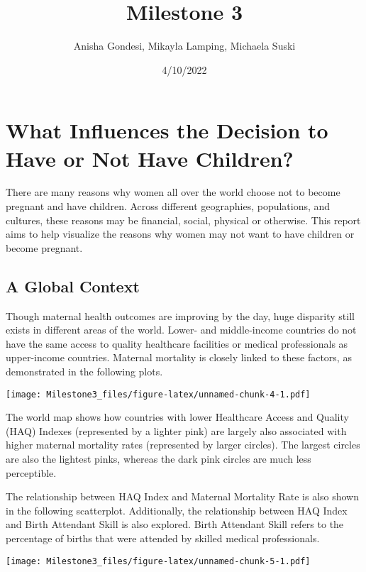 \documentclass[
]{article}
\title{Milestone 3}
\author{Anisha Gondesi, Mikayla Lamping, Michaela Suski}
\date{4/10/2022}
\begin{document}
\maketitle

\hypertarget{what-influences-the-decision-to-have-or-not-have-children}{%
\section{What Influences the Decision to Have or Not Have
Children?}\label{what-influences-the-decision-to-have-or-not-have-children}}

There are many reasons why women all over the world choose not to become
pregnant and have children. Across different geographies, populations,
and cultures, these reasons may be financial, social, physical or
otherwise. This report aims to help visualize the reasons why women may
not want to have children or become pregnant.

\hypertarget{a-global-context}{%
\subsection{A Global Context}\label{a-global-context}}

Though maternal health outcomes are improving by the day, huge disparity
still exists in different areas of the world. Lower- and middle-income
countries do not have the same access to quality healthcare facilities
or medical professionals as upper-income countries. Maternal mortality
is closely linked to these factors, as demonstrated in the following
plots.

\bigskip
\bigskip

\texttt{[image: Milestone3\_files/figure-latex/unnamed-chunk-4-1.pdf]}
\bigskip

The world map shows how countries with lower Healthcare Access and
Quality (HAQ) Indexes (represented by a lighter pink) are largely also
associated with higher maternal mortality rates (represented by larger
circles). The largest circles are also the lightest pinks, whereas the
dark pink circles are much less perceptible.

The relationship between HAQ Index and Maternal Mortality Rate is also
shown in the following scatterplot. Additionally, the relationship
between HAQ Index and Birth Attendant Skill is also explored. Birth
Attendant Skill refers to the percentage of births that were attended by
skilled medical professionals.

\texttt{[image: Milestone3\_files/figure-latex/unnamed-chunk-5-1.pdf]}
\end{document}
